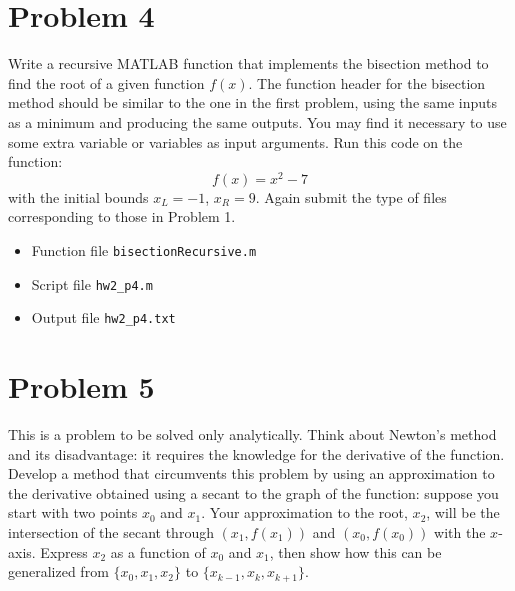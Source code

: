 \section{Problem 4}%
\label{sec:problem_4}
Write a recursive MATLAB function that implements the bisection method to find the root of a given function $f(x)$. The function header for the bisection method should be similar to the one in the first problem, using the same inputs as a minimum and producing the same outputs. You may find it necessary to use some extra variable or variables as input arguments. Run this code on the function:
\begin{equation*}
  f(x) = x^{2} - 7
\end{equation*}
with the initial bounds $x_{L} = -1$, $x_{R} = 9$. Again submit the type of files corresponding to those in Problem 1.
\begin{solution}
  \quad
  \begin{itemize}
    \item
      Function file \verb|bisectionRecursive.m|
      
    \item
      Script file \verb|hw2_p4.m|
      
    \item
      Output file \verb|hw2_p4.txt|
      
  \end{itemize}
\end{solution}

\section{Problem 5}%
\label{sec:problem_5}
This is a problem to be solved only analytically. Think about Newton's method and its disadvantage: it requires the knowledge for the derivative of the function. Develop a method that circumvents this problem by using an approximation to the derivative obtained using a secant to the graph of the function: suppose you start with two points $x_{0}$ and $x_{1}$. Your approximation to the root, $x_{2}$, will be the intersection of the secant through $(x_{1}, f(x_{1}))$ and $(x_{0}, f(x_{0}))$ with the $x$-axis. Express $x_{2}$ as a function of $x_{0}$ and $x_{1}$, then show how this can be generalized from $\{x_{0}, x_{1}, x_{2}\}$ to $\{x_{k - 1}, x_{k}, x_{k + 1}\}$.
\begin{solution}
  \quad \vfill  %
\end{solution}
